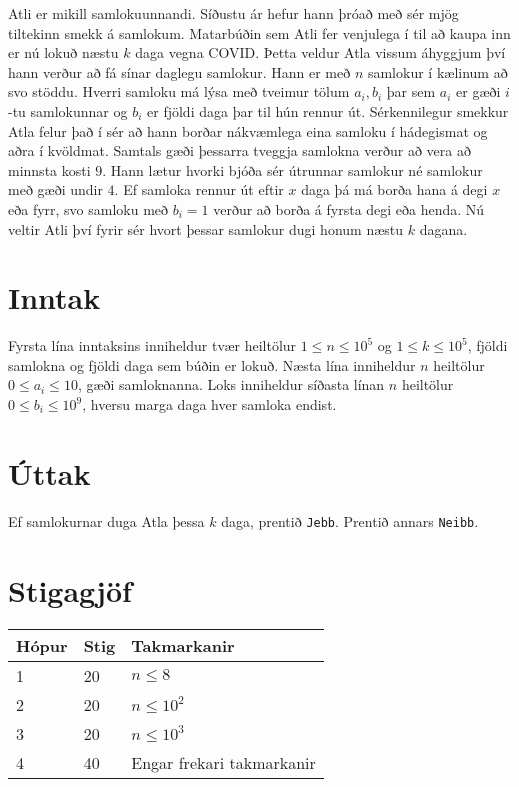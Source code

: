 
Atli er mikill samlokuunnandi. Síðustu ár hefur hann þróað með sér mjög tiltekinn smekk á samlokum. Matarbúðin sem Atli fer venjulega í til að
kaupa inn er nú lokuð næstu $k$ daga vegna COVID. Þetta veldur Atla vissum áhyggjum því hann verður að fá sínar daglegu samlokur. Hann er með
$n$ samlokur í kælinum að svo stöddu. Hverri samloku má lýsa með tveimur tölum $a_i, b_i$ þar sem $a_i$ er gæði $i$-tu samlokunnar og $b_i$ er fjöldi
daga þar til hún rennur út. Sérkennilegur smekkur Atla felur það í sér að hann borðar nákvæmlega eina samloku í hádegismat og aðra
í kvöldmat. Samtals gæði þessarra tveggja samlokna verður að vera að minnsta kosti $9$. Hann lætur hvorki bjóða sér útrunnar samlokur né
samlokur með gæði undir $4$. Ef samloka rennur út eftir $x$ daga þá má borða hana á degi $x$ eða fyrr, svo samloku með $b_i = 1$ verður að borða á fyrsta
degi eða henda. Nú veltir Atli því fyrir sér hvort þessar samlokur dugi honum næstu $k$ dagana.

\section*{Inntak}
Fyrsta lína inntaksins inniheldur tvær heiltölur $1 \leq n \leq 10^5$ og $1 \leq k \leq 10^5$, fjöldi samlokna og fjöldi daga sem búðin er lokuð.
Næsta lína inniheldur $n$ heiltölur $0 \leq a_i \leq 10$, gæði samloknanna.
Loks inniheldur síðasta línan $n$ heiltölur $0 \leq b_i \leq 10^9$, hversu marga daga hver samloka endist.

\section*{Úttak}
Ef samlokurnar duga Atla þessa $k$ daga, prentið \texttt{Jebb}. Prentið annars \texttt{Neibb}.

\section*{Stigagjöf}
\begin{tabular}{|l|l|l|}
\hline
Hópur & Stig & Takmarkanir \\ \hline
1     & 20   & $n \leq 8$ \\ \hline
2     & 20   & $n \leq 10^2$ \\ \hline
3     & 20   & $n \leq 10^3$ \\ \hline
4     & 40   & Engar frekari takmarkanir\\ \hline
\end{tabular}


